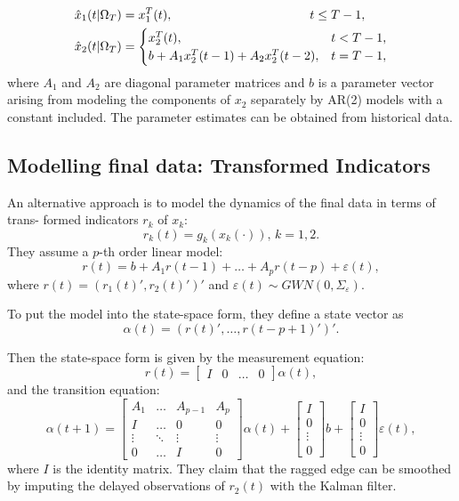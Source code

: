 \documentclass[8pt, a4paper, twocolumn, landscape]{extarticle}
\begin{document}
\begin{align*}
	\hat{x}_1(t | \Omega_T)  &= x_1^T(t), \hspace{3.86cm} t \le T-1, \\
	\hat{x}_2(t | \Omega_T)  &= \begin{cases}
	x_2^T(t), & t < T-1, \\
	b + A_1 x_2^T(t-1) + A_2 x_2^T(t-2), & t = T-1,
	\end{cases}
\end{align*}
where $A_1$ and $A_2$ are diagonal parameter matrices and $b$ is a parameter vector arising from modeling the components of $x_2$ separately by AR(2) models with a constant included. The parameter estimates can be obtained from historical data.

\subsection{Modelling final data: Transformed Indicators}
An alternative approach is to model the dynamics of the final data in terms of trans- formed indicators $r_k$ of $x_k$:
\[
r_k(t) = g_k(x_k(\cdot)), \, k = 1, 2.
\]
They assume a $p$-th order linear model:
\[
r(t) = b + A_1r(t-1) + \dots + A_pr(t-p) + \varepsilon(t),
\]
where $r(t) = \left(r_1(t)', r_2(t)'\right)'$ and $\varepsilon(t) \sim GWN(0, \Sigma_{\varepsilon})$.

To put the model into the state-space form, they define a state vector as 
\[
\alpha(t) = \left( r(t)', \dots, r(t-p+1)' \right)'.
\]

Then the state-space form is given by the measurement equation:
\[
r(t) = \begin{bmatrix}
I & 0 & \dots & 0
\end{bmatrix} \alpha(t),
\]
and the transition equation:
\[
\alpha(t+1) = 
\begin{bmatrix}
A_1 & \dots & A_{p-1} & A_p \\
I & \dots & 0 & 0 \\
\vdots & \ddots & \vdots & \vdots \\
0 & \dots & I & 0
\end{bmatrix} \alpha(t) + 
\begin{bmatrix}
I \\
0 \\
\vdots \\
0
\end{bmatrix}b +
\begin{bmatrix}
I \\
0 \\
\vdots \\
0
\end{bmatrix}\varepsilon(t),
\]
where $I$ is the identity matrix. 
They claim that the ragged edge can be smoothed by imputing the delayed observations of $r_2(t)$ with the Kalman filter.
\end{document}
